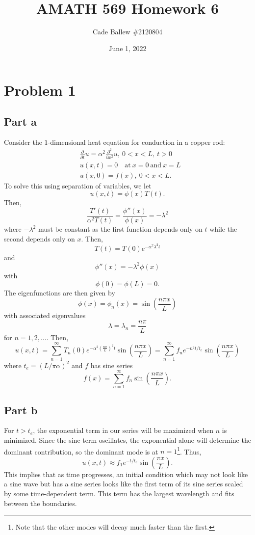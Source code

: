 \documentclass{article}
\title{AMATH 569 Homework 6}
\author{Cade Ballew \#2120804}
\date{June 1, 2022}
\begin{document}
	
\maketitle
	
\section{Problem 1}
\subsection{Part a}
Consider the $1$-dimensional heat equation for conduction in a copper rod:
\begin{equation*}
	\begin{split}
		&\frac{\partial}{\partial t} u = \alpha^2 \frac{\partial^2}{\partial x^2} u, \ 0<x<L, \ t>0\\
		&u(x,t) = 0 \quad \text{at} \ x=0 \ \text{and}\ x=L\\
		&u(x,0) = f(x), \ 0<x<L.
	\end{split}
\end{equation*}
To solve this using separation of variables, we let 
\[
u(x,t)=\phi(x)T(t).
\]
Then,
\[
\frac{T'(t)}{\alpha^2T(t)}=\frac{\phi''(x)}{\phi(x)}=-\lambda^2
\]
where $-\lambda^2$ must be constant as the first function depends only on $t$ while the second depends only on $x$. Then,
\[
T(t)=T(0)e^{-\alpha^2\lambda^2t}
\]
and 
\[
\phi''(x)=-\lambda^2\phi(x)
\]
with 
\[
\phi(0)=\phi(L)=0.
\]
The eigenfunctions are then given by
\[
\phi(x)=\phi_n(x)=\sin\left(\frac{n\pi x}{L}\right)
\]
with associated eigenvalues
\[
\lambda=\lambda_n=\frac{n\pi}{L}
\]
for $n=1,2,\ldots$. Then, 
\[
u(x,t)=\sum_{n=1}^{\infty}T_n(0)e^{-\alpha^2\left(\frac{n\pi}{L}\right)^2t}\sin\left(\frac{n\pi x}{L}\right)=\sum_{n=1}^{\infty}f_ne^{-n^2t/t_e}\sin\left(\frac{n\pi x}{L}\right)
\]
where $t_e=(L/\pi\alpha)^2$ and $f$ has sine series
\[
f(x)=\sum_{n=1}^{\infty}f_n\sin\left(\frac{n\pi x}{L}\right).
\]

\subsection{Part b}
For $t>t_e$, the exponential term in our series will be maximized when $n$ is minimized. Since the sine term oscillates, the exponential alone will determine the dominant contribution, so the dominant mode is at $n=1$\footnote{Note that the other modes will decay much faster than the first.}. Thus,
\[
u(x,t)\approx f_1e^{-t/t_e}\sin\left(\frac{\pi x}{L}\right).
\]
This implies that as time progresses, an initial condition which may not look like a sine wave but has a sine series looks like the first term of its sine series scaled by some time-dependent term. This term has the largest wavelength and fits between the boundaries. 
\end{document}
